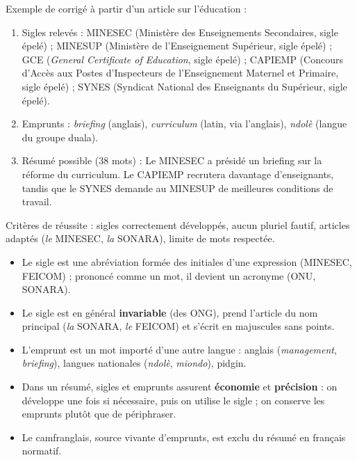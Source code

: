 \documentclass[11pt]{article}
\newcommand{\cle}[1]{{\popxbold\color{popdark}#1}}
\begin{document}
\begin{corrige}
Exemple de corrigé à partir d'un article sur l'éducation :
\begin{enumerate}
\item Sigles relevés : MINESEC (Ministère des Enseignements Secondaires, sigle épelé) ; MINESUP (Ministère de l'Enseignement Supérieur, sigle épelé) ; GCE (\emph{General Certificate of Education}, sigle épelé) ; CAPIEMP (Concours d'Accès aux Postes d'Inspecteurs de l'Enseignement Maternel et Primaire, sigle épelé) ; SYNES (Syndicat National des Enseignants du Supérieur, sigle épelé).
\item Emprunts : \emph{briefing} (anglais), \emph{curriculum} (latin, via l'anglais), \emph{ndolè} (langue du groupe duala).
\item Résumé possible (38 mots) : \og Le MINESEC a présidé un briefing sur la réforme du curriculum. Le CAPIEMP recrutera davantage d'enseignants, tandis que le SYNES demande au MINESUP de meilleures conditions de travail. \fg{}
\end{enumerate}
Critères de réussite : sigles correctement développés, aucun pluriel fautif, articles adaptés (\emph{le} MINESEC, \emph{la} SONARA), limite de mots respectée.
\end{corrige}

\begin{aretenir}
\begin{itemize}
\item Le \cle{sigle} est une abréviation formée des initiales d'une expression (MINESEC, FEICOM) ; prononcé comme un mot, il devient un \cle{acronyme} (ONU, SONARA).
\item Le sigle est en général \textbf{invariable} (des ONG), prend l'article du nom principal (\emph{la} SONARA, \emph{le} FEICOM) et s'écrit en majuscules sans points.
\item L'\cle{emprunt} est un mot importé d'une autre langue : anglais (\emph{management}, \emph{briefing}), langues nationales (\emph{ndolè}, \emph{miondo}), pidgin.
\item Dans un résumé, sigles et emprunts assurent \textbf{économie} et \textbf{précision} : on développe une fois si nécessaire, puis on utilise le sigle ; on conserve les emprunts plutôt que de périphraser.
\item Le camfranglais, source vivante d'emprunts, est exclu du résumé en français normatif.
\end{itemize}
\end{aretenir}
\end{document}
